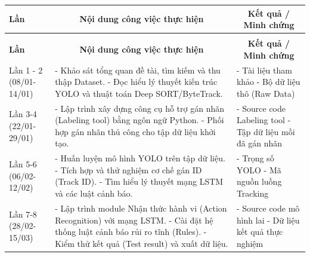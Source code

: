 \begin{center}
	\renewcommand{\arraystretch}{1.5} 
	\begin{longtable}{|>{\centering\arraybackslash}p{2.5cm}|p{6.5cm}|p{5cm}|}
		\hline
		\textbf{Lần} & \multicolumn{1}{c|}{\textbf{Nội dung công việc thực hiện}} & \multicolumn{1}{c|}{\textbf{Kết quả / Minh chứng}} \\
		\hline
		\endfirsthead
		
		\multicolumn{3}{c}{\textit{(Tiếp tục từ trang trước)}} \\
		\hline
		\textbf{Lần} & \multicolumn{1}{c|}{\textbf{Nội dung công việc thực hiện}} & \multicolumn{1}{c|}{\textbf{Kết quả / Minh chứng}} \\
		\hline
		\endhead
		
		\hline
		\endfoot
		\endlastfoot
		
		Lần 1 - 2 \newline (08/01-14/01)  & 
		- Khảo sát tổng quan đề tài, tìm kiếm và thu thập Dataset. \newline
		- Đọc hiểu lý thuyết kiến trúc YOLO và thuật toán Deep SORT/ByteTrack. & 
		- Tài liệu tham khảo \newline
		- Bộ dữ liệu thô (Raw Data) \\
		\hline
		
		Lần 3-4 \newline (22/01-29/01)  & 
		- Lập trình xây dựng công cụ hỗ trợ gán nhãn (Labeling tool) bằng ngôn ngữ Python. \newline
		- Phối hợp gán nhãn thủ công cho tập dữ liệu khởi tạo. & 
		- Source code Labeling tool \newline
		- Tập dữ liệu mồi đã gán nhãn \\
		\hline
		
		Lần 5-6 \newline (06/02-12/02)  & 
		- Huấn luyện mô hình YOLO trên tập dữ liệu. \newline
		- Tích hợp và thử nghiệm cơ chế gán ID (Track ID). \newline
		- Tìm hiểu lý thuyết mạng LSTM và các luật cảnh báo. & 
		- Trọng số YOLO \newline
		- Mã nguồn luồng Tracking \\
		\hline
		
		Lần 7-8 \newline (28/02-15/03)  & 
		- Lập trình module Nhận thức hành vi (Action Recognition) với mạng LSTM. \newline
		- Cài đặt hệ thống luật cảnh báo rủi ro tĩnh (Rules). \newline
		- Kiểm thử kết quả (Test result) và xuất dữ liệu. & 
		- Source code mô hình lai \newline
		- Dữ liệu kết quả thực nghiệm \\
		\hline
		

\end{longtable}
\end{center}
